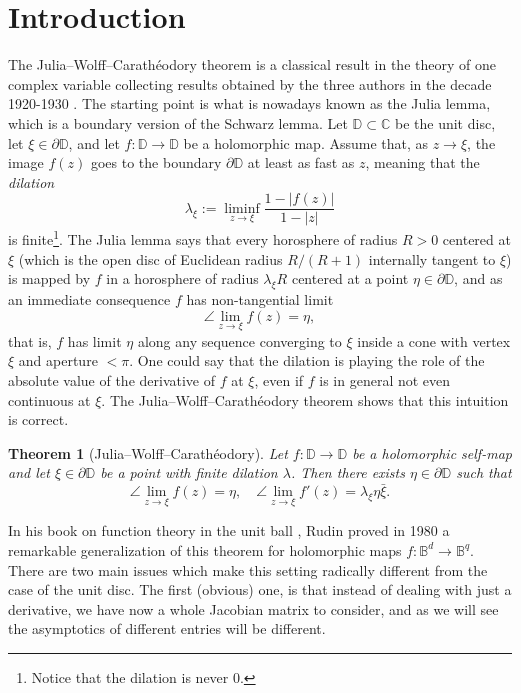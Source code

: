 \documentclass[11pt, reqno]{amsart}
\numberwithin{equation}{section}
\newtheorem{theorem}{Theorem}[section]
\theoremstyle{definition}
\newcommand{\C}{\mathbb{C}}
\newcommand{\D}{\mathbb{D}}
\newcommand{\B}{\mathbb{B}}
\begin{document}
	\maketitle
	\tableofcontents
	
	
	
	\section{Introduction}
	
	The Julia--Wolff--Carath\'eodory theorem    is a classical result in the theory of one complex variable collecting  results obtained  by the three authors in the decade 1920-1930 \cite{Julia,Wolff,Carath}.   The starting point is what is nowadays known as the Julia lemma, which is a boundary version of the Schwarz lemma. Let $\D\subset \C$ be the unit disc, let $\xi\in \partial \D$, and let $f\colon \D\to\D$ be a holomorphic map.    Assume that, as $z\to \xi$,  the image $f(z)$ goes to  the boundary $\partial \D$ at least as fast as  $z$, meaning that the {\sl dilation}
	$$\lambda_\xi:=\liminf_{z\to\xi}\frac{1-|f(z)|}{1-|z|}$$ is finite\footnote{Notice that the dilation is never 0.}.  The Julia lemma says that every horosphere of radius $R>0$ centered at $\xi$ (which is the open disc of Euclidean radius $R/(R+1)$ internally tangent to $\xi$) is mapped by $f$ in a horosphere of radius $\lambda_\xi R$ centered at a point $\eta\in \partial \D$, and as an immediate consequence $f$ has non-tangential limit 
	$$\angle\lim_{z\to\xi} f(z)=\eta,$$
	that is, $f$ has limit $\eta$ along any sequence converging to $\xi$ inside a cone with vertex $\xi$ and aperture $<\pi$.
	One could say that the dilation is playing the role of the absolute value of the derivative of $f$ at $\xi$, even if $f$ is in general  not even continuous at $\xi$.
	The  Julia--Wolff--Carath\'eodory theorem shows that this intuition is correct.
	\begin{theorem}[Julia--Wolff--Carath\'eodory]\label{JWC1d} Let $f\colon\D\to\D$ be a holomorphic self-map and let $\xi\in\partial\D$ be a point with finite dilation $\lambda$. Then there exists  $\eta\in\partial\D$ such that 
		$$\angle\lim_{z\to\xi} f(z)=\eta,\quad \angle\lim_{z\to\xi} f'(z)=\lambda_\xi\eta\bar{\xi}.$$
	\end{theorem}
	
	In his book on function theory in the unit ball \cite{Rudin}, Rudin proved in 1980 a remarkable generalization of this theorem for holomorphic maps $f\colon \B^d\to \B^q$. There are two main issues which make this setting radically different from the case of the unit disc. 
	The first  (obvious) one, is that instead of dealing with just a derivative, we have now a whole Jacobian matrix to consider, and as we will see the asymptotics of different entries will be different.
	
\end{document}
